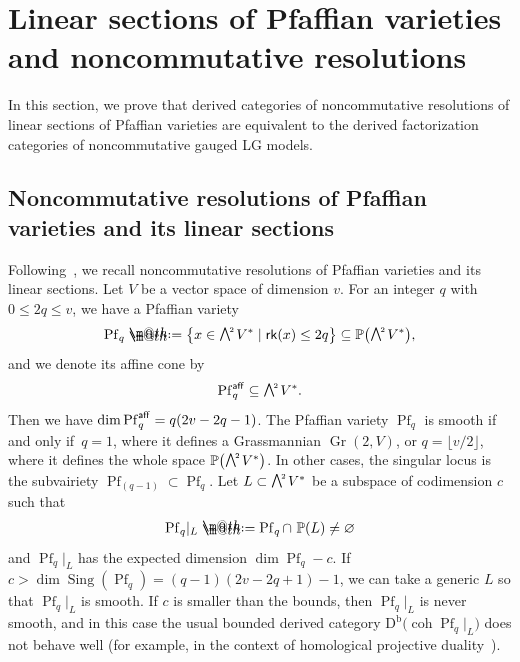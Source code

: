 \documentclass[pdftex]{sigma}%
\makeatletter
\newcommand*{\defeq}{\mathrel{\rlap{%
 \raisebox{0.3ex}{$\m@th\cdot$}}%
 \raisebox{-0.3ex}{$\m@th\cdot$}}%
 =}
\numberwithin{equation}{section}
\newcommand{\Sing}{\operatorname{Sing}}
\newcommand{\coh}{\operatorname{coh}}
\newcommand{\Db}{\operatorname{D^b}}
\newcommand{\Pf}{\operatorname{Pf}}
\newcommand{\Gr}{\operatorname{Gr}}
\newcommand{\aff}{\operatorname{\sf aff}}
\newcommand{\rk}{\operatorname{\sf rk}}
\newcommand{\bP}{\mathbb{P}}
\newcommand{\gwedge}{\raisebox{1pt}[0pt][0pt]{$\textstyle \bigwedge^{\raisebox{-1pt}[0pt][0pt]{\tiny\!$2$\,}}$}}
\newcommand{\rest}{\!|_L}
\makeatother
\begin{document}









\section[Linear sections of Pfaffian varieties and noncommutative resolutions]
{Linear sections of Pfaffian varieties\\ and noncommutative resolutions}

In this section, we prove that derived categories of noncommutative resolutions of linear sections of Pfaffian varieties are equivalent to the derived factorization categories of noncommutative gauged LG models.

\subsection{Noncommutative resolutions of Pfaffian varieties and its linear sections} Following~\cite{rs}, we recall noncommutative resolutions of Pfaffian varieties and its linear sections.
Let $V$ be a vector space of dimension $v$. For an integer $q$ with $0\leq 2q\leq v$, we have a Pfaffian variety
\begin{gather*}
\Pf_q\defeq\big\{x\in\gwedge V^* \mid \rk(x)\leq 2q\big\}\subseteq \bP\big(\gwedge V^*\big),
\end{gather*}
and we denote its affine cone by
\begin{gather*}
\Pf_q^{\aff}\subseteq \gwedge V^*.
\end{gather*}
Then we have $\dim \Pf_q^{\aff}=q(2v-2q-1)$.
The Pfaffian variety $\Pf_q$ is smooth if and only if~$q=1$, where it defines a Grassmannian $\Gr(2,V)$, or $q=\lfloor v/2\rfloor$, where it defines the whole space $\bP\big(\gwedge V^*\big)$. In other cases, the singular locus is the subvairiety $\Pf_{(q-1)}\subset \Pf_q$. Let $L\subset \gwedge V^*$ be a subspace of codimension $c$ such that
\begin{gather*}
\Pf_q\rest\defeq\Pf_q\cap\,\,\bP(L)\neq\varnothing
\end{gather*}
and $\Pf_q\rest$ has the expected dimension $\dim\Pf_q-c$. If $c>\dim \Sing(\Pf_q)=(q-1)(2v-2q+1)-1$, we can take a generic $L$ so that $\Pf_q\rest$ is smooth. If $c$ is smaller than the bounds, then $\Pf_q\rest$ is never smooth, and in this case the usual bounded derived category $\Db\big(\coh \Pf_q\rest\big)$ does not behave well (for example, in the context of homological projective duality~\cite{rs}). %
\end{document}
